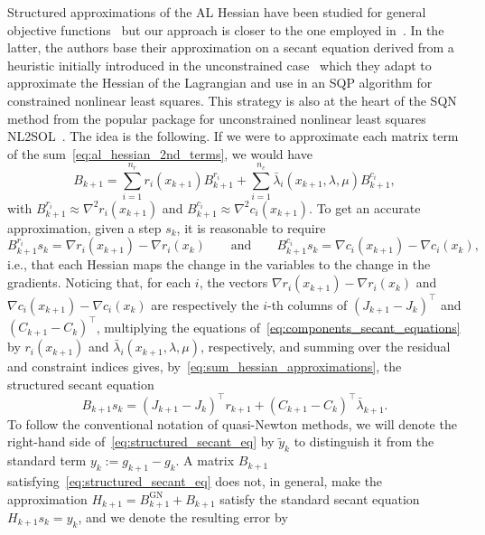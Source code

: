 \documentclass{article}
\numberwithin{equation}{section}
\theoremstyle{plain}
\begin{document}
Structured approximations of the AL Hessian have been studied for general objective functions~\cite{tapia:1988} but our approach is closer to the one employed in~\cite{li-etal:2002}. In the latter, the authors base their approximation on a secant equation derived from a heuristic initially introduced in the unconstrained case~\cite{biggs:1977} which they adapt to approximate the Hessian of the Lagrangian and use in an SQP algorithm for constrained nonlinear least squares. This strategy is also at the heart of the SQN method from the popular package for unconstrained nonlinear least squares NL2SOL~\cite{dennisetal:1981,dennis-etal:1989}. The idea is the following. If we were to approximate each matrix term of the sum~\eqref{eq:al_hessian_2nd_terms}, we would have
\begin{equation}\label{eq:sum_hessian_approximations}
	B_{k+1} = \sum_{i=1}^{n_r}  r_i(x_{k+1}) B^{r_i}_{k+1} + \sum_{i=1}^{n_c} \bar{\lambda}_i(x_{k+1},\lambda,\mu) B^{c_i}_{k+1},
\end{equation}
with $B^{r_i}_{k+1} \approx \nabla^2r_i(x_{k+1})$ and $B^{c_i}_{k+1} \approx  \nabla^2 c_i(x_{k+1})$. To get an accurate approximation, given a step $s_k$, it is reasonable to require
\begin{equation}\label{eq:components_secant_equations}
	B^{r_i}_{k+1}s_k = \nabla r_i(x_{k+1}) - \nabla r_i(x_k) \qquad \text{and} \qquad B^{c_i}_{k+1}s_k = \nabla c_i(x_{k+1}) - \nabla c_i(x_k),
\end{equation}
i.e., that each Hessian maps the change in the variables to the change in the gradients. Noticing that, for each $i$, the vectors $\nabla r_i(x_{k+1}) - \nabla r_i(x_k)$ and $\nabla c_i(x_{k+1}) - \nabla c_i(x_k)$ are respectively the $i$-th columns of $\left(J_{k+1}-J_k\right)^\top$ and $\left(C_{k+1}-C_k\right)^\top$, multiplying the equations of~\eqref{eq:components_secant_equations} by $r_i(x_{k+1})$ and $\bar{\lambda}_i(x_{k+1},\lambda,\mu)$, respectively, and summing over the residual and constraint indices gives, by~\eqref{eq:sum_hessian_approximations}, the structured secant equation
\begin{equation}\label{eq:structured_secant_eq}
	B_{k+1}s_k = \left(J_{k+1}-J_k\right)^\top r_{k+1} + \left(C_{k+1}-C_k\right)^\top\bar{\lambda}_{k+1}.
\end{equation}
To follow the conventional notation of quasi-Newton methods, we will denote the right-hand side of~\eqref{eq:structured_secant_eq} by $\tilde{y}_k$ to distinguish it from the standard term $y_k:= g_{k+1}-g_k$. A matrix $B_{k+1}$ satisfying~\eqref{eq:structured_secant_eq} does not, in general, make the approximation $H_{k+1} = B^{\mathrm{GN}}_{k+1} + B_{k+1}$ satisfy the standard secant equation $H_{k+1}s_k = y_k$, and we denote the resulting error by
\end{document}
